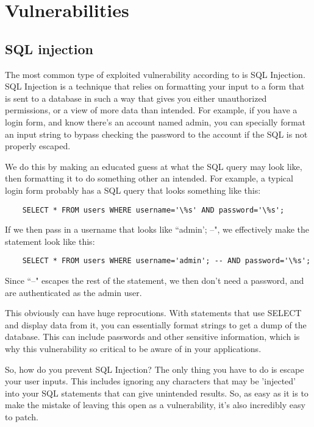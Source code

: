\documentclass{report}
\begin{document}
\section*{Vulnerabilities}

\subsection*{SQL injection}

The most common type of exploited vulnerability according to
\cite{mostcommonvulnerability} is SQL Injection. SQL Injection is a technique
that relies on formatting your input to a form that is sent to a database in
such a way that gives you either unauthorized permissions, or a view of more
data than intended. For example, if you have a login form, and know there's
an account named admin, you can specially format an input string to bypass
checking the password to the account if the SQL is not properly escaped.

We do this by making an educated guess at what the SQL query may look like,
then formatting it to do something other an intended. For example, a typical
login form probably has a SQL query that looks something like this:

\begin{verbatim}
    SELECT * FROM users WHERE username='\%s' AND password='\%s';
\end{verbatim}

If we then pass in a username that looks like ``admin'; --", we effectively
make the statement look like this:

\begin{verbatim}
    SELECT * FROM users WHERE username='admin'; -- AND password='\%s';
\end{verbatim}

Since ``--" escapes the rest of the statement, we then don't need a password,
and are authenticated as the admin user.

This obviously can have huge reprocutions. With statements that use SELECT and
display data from it, you can essentially format strings to get a dump of the
database. This can include passwords and other sensitive information, which
is why this vulnerability so critical to be aware of in your applications.

So, how do you prevent SQL Injection? The only thing you have to do is escape
your user inputs. This includes ignoring any characters that may be 'injected'
into your SQL statements that can give unintended results. So, as easy as it
is to make the mistake of leaving this open as a vulnerability, it's also
incredibly easy to patch.
\end{document}
